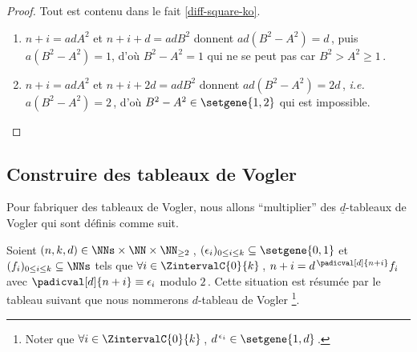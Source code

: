 \begin{proof}
	Tout est contenu dans le fait \ref{diff-square-ko}.
	
	\begin{enumerate}

		\item $n + i = ad A^2$ et $n + i + d = ad B^2$ donnent $ad (B^2 - A^2) = d$\,, puis $a (B^2 - A^2) = 1$, d'où $B^2 - A^2 = 1$ qui ne se peut pas car $B^2 > A^2 \geq 1$\,.

		\item $n + i = ad A^2$ et $n + i + 2 d = ad B^2$ donnent $ad (B^2 - A^2) = 2d$\,, \emph{i.e.} $a (B^2 - A^2) = 2$\,, d'où $B^2 - A^2 \in \setgene{1, 2}$ qui est impossible.
	\end{enumerate}
\end{proof}




\subsection{Construire des tableaux de Vogler}

\leavevmode

\smallskip
Pour fabriquer des tableaux de Vogler, nous allons \enquote{multiplier} des $\underline{d}$-tableaux de Vogler qui sont définis comme suit.
	

\begin{defi}
	Soient $(n, k, d) \in \NNs \times \NN \times \NN_{\geq 2}$\,,
	$( \epsilon_i )_{0 \leq i \leq k} \subseteq \setgene{0, 1}$
	et
	$( f_i )_{0 \leq i \leq k} \subseteq \NNs$
	tels que 
	$\forall i \in \ZintervalC{0}{k}$\,, $n + i = d^{\,\padicval[d]{n+i}} f_i$ avec $\padicval[d]{n+i} \equiv \epsilon_i$ modulo $2$\,.
	Cette situation est résumée par le tableau suivant que nous nommerons $d$-tableau de Vogler
	\footnote{
		Noter que $\forall i \in \ZintervalC{0}{k}$\,, $d^{\,\epsilon_i} \in \setgene{1, d}$\,.
	}.

	\begin{center}
	\end{center}
\end{defi}


